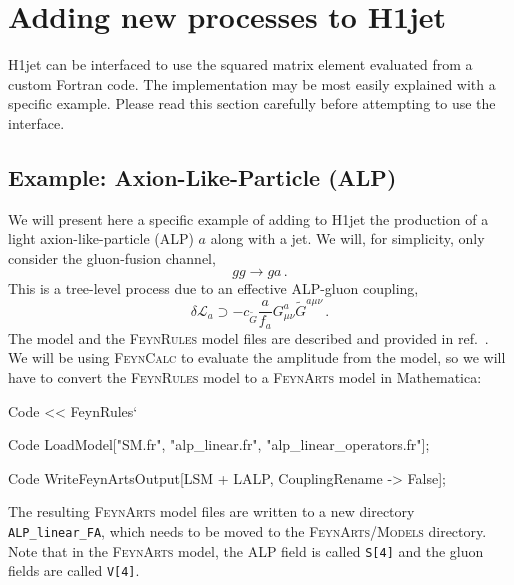 \documentclass[12pt,a4wide]{article}
\begin{document}
\newpage 

\section{Adding new processes to H1jet} \label{sec:newprocs} 
H1jet can be interfaced to use the squared matrix element evaluated from a custom Fortran code. The implementation may be most easily explained with a specific example. Please read this section carefully before attempting to use the interface. 

\subsection{Example: Axion-Like-Particle (ALP)}
We will present here a specific example of adding to H1jet the production of a light axion-like-particle (ALP) $a$ along with a jet. We will, for simplicity, only consider the gluon-fusion channel, 
\begin{equation}
    g g \rightarrow g a \,. 
\end{equation}
This is a tree-level process due to an effective ALP-gluon coupling, 
\begin{equation}
   \delta \mathcal{L}_a \supset -c_{\tilde{G}}\frac{a}{f_a} G_{\mu\nu}^{a} \tilde{G}^{a \mu\nu} \,. \label{eq:ggacoupling}
\end{equation}
The model and the \textsc{FeynRules} \cite{bib:feynrules} model files are described and provided in ref.\ \cite{bib:alp}. We will be using \textsc{FeynCalc} \cite{bib:feyncalc} to evaluate the amplitude from the model, so we will have to convert the \textsc{FeynRules} model to a \textsc{FeynArts} \cite{bib:feynarts} model in Mathematica: 
\begin{mmaCell}{Code}
<< FeynRules` 
\end{mmaCell}
\begin{mmaCell}{Code}
LoadModel["SM.fr", "alp_linear.fr", "alp_linear_operators.fr"];  
\end{mmaCell}
\begin{mmaCell}{Code}
WriteFeynArtsOutput[LSM + LALP, CouplingRename -> False]; 
\end{mmaCell}
The resulting \textsc{FeynArts} model files are written to a new directory \texttt{ALP\_linear\_FA}, which needs to be moved to the \textsc{FeynArts/Models} directory. Note that in the \textsc{FeynArts} model, the ALP field is called \texttt{S[4]} and the gluon fields are called \texttt{V[4]}. 
\end{document}
